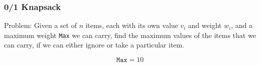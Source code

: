 \documentclass{beamer}
\begin{document}
\begin{frame}%
\frametitle{0/1 Knapsack}


\begin{mdframed}[style=exampledefault]
Problem: Given a set of $n$ items, each with its own value $v_i$ and weight $w_i$, and a maximum weight \texttt{Max} we can carry,
find the maximum values of the items that we can carry, if we can either ignore or take a particular item.
\end{mdframed}

\begin{overlayarea}{1\textwidth}{0.6\textheight}
\Large
$$
\texttt{Max} = 10
$$

\Large
{}
\end{overlayarea}

\end{frame}
\end{document}
